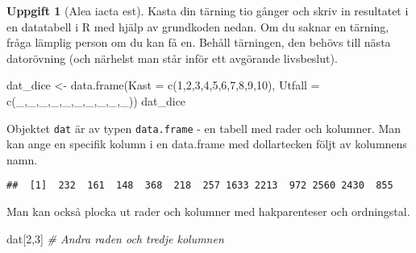 \documentclass[
]{book}
\newenvironment{Shaded}{\begin{snugshade}}{\end{snugshade}}
\newcommand{\AttributeTok}[1]{\textcolor[rgb]{0.77,0.63,0.00}{#1}}
\newcommand{\CommentTok}[1]{\textcolor[rgb]{0.56,0.35,0.01}{\textit{#1}}}
\newcommand{\DecValTok}[1]{\textcolor[rgb]{0.00,0.00,0.81}{#1}}
\newcommand{\FunctionTok}[1]{\textcolor[rgb]{0.00,0.00,0.00}{#1}}
\newcommand{\NormalTok}[1]{#1}
\newcommand{\OtherTok}[1]{\textcolor[rgb]{0.56,0.35,0.01}{#1}}
\newcommand{\SpecialCharTok}[1]{\textcolor[rgb]{0.00,0.00,0.00}{#1}}
\theoremstyle{definition}
\theoremstyle{definition}
\theoremstyle{definition}
\newtheorem{exercise}{Uppgift}[chapter]
\theoremstyle{definition}
\theoremstyle{remark}
\begin{document}
\begin{exercise}[Alea iacta est]

Kasta din tärning tio gånger och skriv in resultatet i en datatabell i R med hjälp av grundkoden nedan. Om du saknar en tärning, fråga lämplig person om du kan få en. Behåll tärningen, den behövs till nästa datorövning (och närhelst man står inför ett avgörande livsbeslut).

\begin{Shaded}
\begin{Highlighting}[]
\NormalTok{dat\_dice }\OtherTok{\textless{}{-}} \FunctionTok{data.frame}\NormalTok{(}\AttributeTok{Kast =} \FunctionTok{c}\NormalTok{(}\DecValTok{1}\NormalTok{,}\DecValTok{2}\NormalTok{,}\DecValTok{3}\NormalTok{,}\DecValTok{4}\NormalTok{,}\DecValTok{5}\NormalTok{,}\DecValTok{6}\NormalTok{,}\DecValTok{7}\NormalTok{,}\DecValTok{8}\NormalTok{,}\DecValTok{9}\NormalTok{,}\DecValTok{10}\NormalTok{),}
                       \AttributeTok{Utfall =} \FunctionTok{c}\NormalTok{(\_,\_,\_,\_,\_,\_,\_,\_,\_,\_))}
\NormalTok{dat\_dice}
\end{Highlighting}
\end{Shaded}

\end{exercise}

Objektet \texttt{dat} är av typen \texttt{data.frame} - en tabell med rader och kolumner. Man kan ange en specifik kolumn i en data.frame med dollartecken följt av kolumnens namn.

\begin{Shaded}
\end{Shaded}

\begin{verbatim}
##  [1]  232  161  148  368  218  257 1633 2213  972 2560 2430  855
\end{verbatim}

Man kan också plocka ut rader och kolumner med hakparenteser och ordningstal.

\begin{Shaded}
\begin{Highlighting}[]
\NormalTok{dat[}\DecValTok{2}\NormalTok{,}\DecValTok{3}\NormalTok{]          }\CommentTok{\# Andra raden och tredje kolumnen}
\end{Highlighting}
\end{Shaded}
\end{document}
